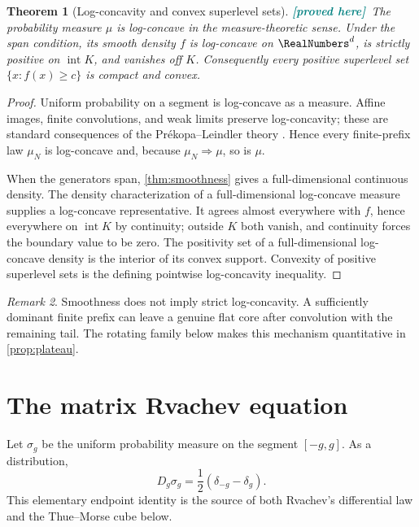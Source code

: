 \documentclass[11pt,oneside]{article}
\newtheorem{theorem}{Theorem}[section]
\theoremstyle{definition}
\theoremstyle{remark}
\newtheorem{remark}[theorem]{Remark}
\newcommand{\New}{\textcolor{teal}{\textbf{[proved here]}}}
\begin{document}
\begin{theorem}[Log-concavity and convex superlevel sets]
\label{thm:logconcavity}
\New\ The probability measure $\mu$ is log-concave in the measure-theoretic
sense.  Under the span condition, its smooth density $f$ is log-concave on
$\RealNumbers^d$, is strictly positive on $\operatorname{int}K$, and vanishes off $K$.
Consequently every positive superlevel set $\{x:f(x)\ge c\}$ is compact and
convex.
\end{theorem}

\begin{proof}
Uniform probability on a segment is log-concave as a measure.  Affine images,
finite convolutions, and weak limits preserve log-concavity; these are standard
consequences of the Pr\'ekopa--Leindler theory \cite{Prekopa}.  Hence every
finite-prefix law $\mu_N$ is log-concave and, because $\mu_N\Rightarrow\mu$,
so is $\mu$.

When the generators span, \cref{thm:smoothness} gives a full-dimensional
continuous density.  The density characterization of a full-dimensional
log-concave measure supplies a log-concave representative.  It agrees almost
everywhere with $f$, hence everywhere on $\operatorname{int}K$ by continuity;
outside $K$ both vanish, and continuity forces the boundary value to be zero.
The positivity set of a full-dimensional log-concave density is the interior of
its convex support.  Convexity of positive superlevel sets is the defining
pointwise log-concavity inequality.
\end{proof}

\begin{remark}
Smoothness does not imply strict log-concavity.  A sufficiently dominant finite
prefix can leave a genuine flat core after convolution with the remaining tail.
The rotating family below makes this mechanism quantitative in
\cref{prop:plateau}.
\end{remark}

\section{The matrix Rvachev equation}
\label{sec:rvachev-equation}

Let $\sigma_g$ be the uniform probability measure on the segment $[-g,g]$.
As a distribution,
\begin{equation}
 D_g\sigma_g=\frac12(\delta_{-g}-\delta_g).
 \label{eq:segment-derivative}
\end{equation}
This elementary endpoint identity is the source of both Rvachev's differential
law and the Thue--Morse cube below.
\end{document}
